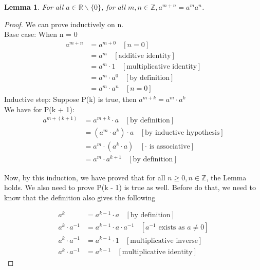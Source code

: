 \documentclass{book}
\newtheorem{lemma}[theorem]{Lemma}
\begin{document}
\begin{lemma}
    For all $a \in \mathbb{R} \backslash \{ 0 \}$, for all $m, n \in \mathbb{Z}, a^{m + n} = a^{m}a^{n}$.
\end{lemma}

\begin{proof}
    We can prove inductively on n. \\
    Base case: When n = 0
    \begin{align*}
        a^{m + n} & = a^{m + 0} \ \ \ \ [n = 0] \\
        & = a^{m} \ \ \ \ [\text{additive identity}] \\
        & = a^{m} \cdot 1 \ \ \ \ [\text{multiplicative identity}] \\
        & = a^{m} \cdot a^{0} \ \ \ \ [\text{by definition}] \\
        & = a^{m} \cdot a^{n} \ \ \ \ [n = 0]
    \end{align*}
    Inductive step: Suppose P(k) is true, then $a^{m + k} = a^{m} \cdot a^{k}$ \\
    We have for P(k + 1):
    \begin{align*}
        a^{m + (k + 1)} & = a^{m + k} \cdot a \ \ \ \ [\text{by definition}] \\
        & = (a^{m} \cdot a^{k}) \cdot a \ \ \ \ [\text{by inductive hypothesis}] \\
        & = a^{m} \cdot (a^{k} \cdot a) \ \ \ \ [\cdot \text{ is associative}] \\
        & = a^{m} \cdot a^{k + 1} \ \ \ \ [\text{by definition}]
    \end{align*}
    
    Now, by this induction, we have proved that for all $n \geq 0, n \in \mathbb{Z}$, the Lemma holds. We also need to prove P(k - 1) is true as well. Before do that, we need to know that the definition also gives the following
    
    \begin{align*}
        a^{k} & = a^{k - 1} \cdot a \ \ \ \ [\text{by definition}] \\
        a^{k} \cdot a^{-1} & = a^{k - 1} \cdot a \cdot a^{-1} \ \ \ \ [a^{-1} \text{ exists as } a \neq 0] \\
        a^{k} \cdot a^{-1} & = a^{k - 1} \cdot 1 \ \ \ \ [\text{multiplicative inverse}] \\
        a^{k} \cdot a^{-1} & = a^{k - 1} \ \ \ \ [\text{multiplicative identity}]
    \end{align*}


\end{proof}
\end{document}
